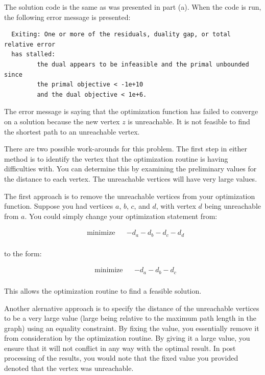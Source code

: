 \documentclass[../report/main.tex]{subfiles}
\begin{document}
\begin{enumerate}[a)]

  The solution code is the same as was presented in part (a). When the code is run, the following error message is presented: \\

  \begin{verbatim}
  Exiting: One or more of the residuals, duality gap, or total relative error
  has stalled:
         the dual appears to be infeasible and the primal unbounded since
         the primal objective < -1e+10
         and the dual objective < 1e+6.
  \end{verbatim}

  The error message is saying that the optimization function has failed to converge on a solution because the new vertex $z$ is unreachable. It is not feasible to find the shortest path to an unreachable vertex.

  There are two possible work-arounds for this problem. The first step in either method is to identify the vertex that the optimization routine is having difficulties with. You can determine this by examining the preliminary values for the distance to each vertex. The unreachable vertices will have very large values.

  The first approach is to remove the unreachable vertices from your optimization function. Suppose you had vertices $a$, $b$, $c$, and $d$, with vertex $d$ being unreachable from $a$. You could simply change your optimization statement from:

  \begin{equation*}
    \begin{aligned}
      & \text{minimize} & & -d_a - d_b - d_c - d_d \\
    \end{aligned}
  \end{equation*}

  to the form:

  \begin{equation*}
    \begin{aligned}
      & \text{minimize} & & -d_a - d_b - d_c \\
    \end{aligned}
  \end{equation*}

  This allows the optimization routine to find a feasible solution.

  Another alernative approach is to specify the distance of the unreachable vertices to be a very large value (large being relative to the maximum path length in the graph) using an equality constraint. By fixing the value, you essentially remove it from consideration by the optimization routine. By giving it a large value, you ensure that it will not conflict in any way with the optimal result. In post processing of the results, you would note that the fixed value you provided denoted that the vertex was unreachable.


\end{enumerate}
\end{document}
